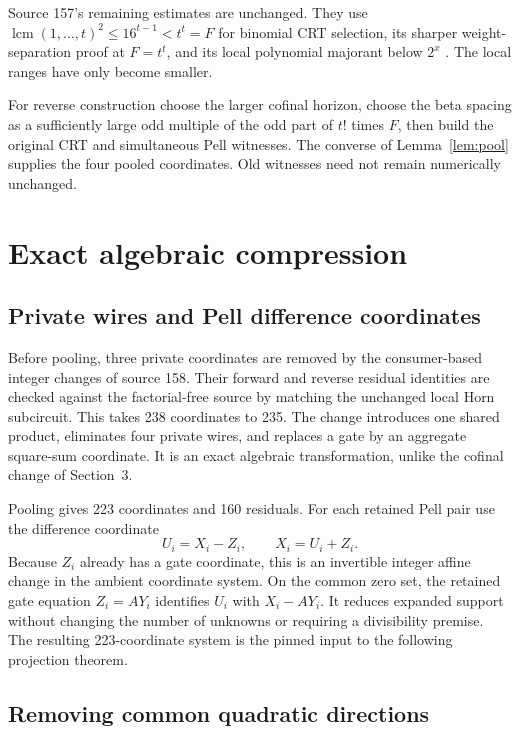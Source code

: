\documentclass[11pt,letterpaper]{article}
\theoremstyle{remark}
\begin{document}
Source 157's remaining estimates are unchanged. They use
\(\operatorname{lcm}(1,\ldots,t)^2\le16^{t-1}<t^t=F\)
for binomial CRT selection, its sharper weight-separation proof
at \(F=t^t\), and its local polynomial majorant below \(2^x\)
\cite{s157}. The local ranges have only become smaller.

For reverse construction choose the larger cofinal horizon,
choose the beta spacing as a sufficiently large odd multiple of
the odd part of \(t!\) times \(F\), then build the original CRT
and simultaneous Pell witnesses. The converse of
Lemma~\ref{lem:pool} supplies the four pooled coordinates.
Old witnesses need not remain numerically unchanged.

\section{Exact algebraic compression}

\subsection{Private wires and Pell difference coordinates}

Before pooling, three private coordinates are removed by the
consumer-based integer changes of source 158. Their forward and
reverse residual identities are checked against the factorial-free
source by matching the unchanged local Horn subcircuit.
This takes 238 coordinates to 235. The change introduces one
shared product, eliminates four private wires, and replaces a gate
by an aggregate square-sum coordinate. It is an exact algebraic
transformation, unlike the cofinal change of Section~3.

Pooling gives 223 coordinates and 160 residuals.
For each retained Pell pair use the difference coordinate
\[
 U_i=X_i-Z_i,\qquad X_i=U_i+Z_i.
\]
Because \(Z_i\) already has a gate coordinate, this is an invertible
integer affine change in the ambient coordinate system.
On the common zero set, the retained gate equation \(Z_i=AY_i\)
identifies \(U_i\) with \(X_i-AY_i\).
It reduces expanded support without changing the number of
unknowns or requiring a divisibility premise. The resulting
223-coordinate system is the pinned input to the following
projection theorem.

\subsection{Removing common quadratic directions}
\end{document}
